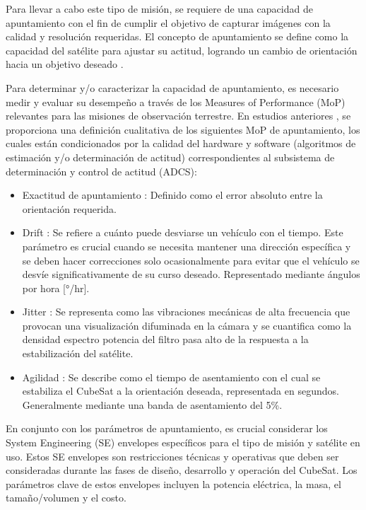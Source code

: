Para llevar a cabo este tipo de misión, se requiere de una capacidad de apuntamiento con el fin de cumplir el objetivo de capturar imágenes con la calidad y resolución requeridas. El concepto de apuntamiento se define como la capacidad del satélite para ajustar su actitud, logrando un cambio de orientación hacia un objetivo deseado \cite{ref5}. 

Para determinar y/o caracterizar la capacidad de apuntamiento, es necesario medir y evaluar su desempeño a través de los Measures of Performance (MoP) relevantes para las misiones de observación terrestre. En estudios anteriores \cite{ref5, ref6, ref7, ref8} , se proporciona una definición cualitativa de los siguientes MoP de apuntamiento, los cuales están condicionados por la calidad del hardware y software (algoritmos de estimación y/o determinación de actitud) correspondientes al subsistema de determinación y control de actitud (ADCS):

\begin{itemize}
	\item Exactitud de apuntamiento \cite{ref5,ref7}: Definido como el error absoluto entre la orientación requerida.
	\item Drift \cite{ref5}: Se refiere a cuánto puede desviarse un vehículo con el tiempo. Este parámetro es crucial cuando se necesita mantener una dirección específica y se deben hacer correcciones solo ocasionalmente para evitar que el vehículo se desvíe significativamente de su curso deseado. Representado mediante ángulos por hora [°/hr].
	\item Jitter \cite{ref9,ref10}: Se representa como las vibraciones mecánicas de alta frecuencia que provocan una visualización difuminada en la cámara y se cuantifica como la densidad espectro potencia del filtro pasa alto de la respuesta a la estabilización del satélite.
	\item Agilidad \cite{ref11}: Se describe como el tiempo de asentamiento con el cual se estabiliza el CubeSat a la orientación deseada, representada en segundos. Generalmente mediante una banda de asentamiento del 5\%.
\end{itemize}

En conjunto con los parámetros de apuntamiento, es crucial considerar los System Engineering (SE) envelopes específicos para el tipo de misión y satélite en uso. Estos SE envelopes son restricciones técnicas y operativas que deben ser consideradas durante las fases de diseño, desarrollo y operación del CubeSat. Los parámetros clave de estos envelopes incluyen la potencia eléctrica, la masa, el tamaño/volumen y el costo.

